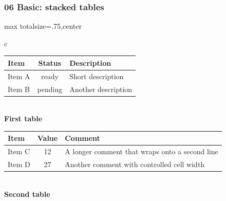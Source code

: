 
\begin{frame}
    \frametitle{06 Basic: stacked tables}

    \begin{adjustbox}{max totalsize={\textwidth}{.75\textheight},center}
        \begin{tabular}{c}
            \begin{tabular}{l c l}
                \toprule
                \textbf{\alert{Item}} & \textbf{\alert{Status}} & \textbf{\alert{Description}} \\
                \midrule
                Item A & ready & Short description \\
                Item B & pending & Another description \\
                \bottomrule
            \end{tabular}\\[-.1em]
            \textbf{First table}\\[1em]
            \begin{tabular}{p{} c p{}}
                \toprule
                \textbf{\alert{Item}} & \textbf{\alert{Value}} & \textbf{\alert{Comment}} \\
                \midrule
                Item C & 12 & A longer comment that wraps onto a second line \\
                Item D & 27 & Another comment with controlled cell width \\
                \bottomrule
            \end{tabular}\\[-.1em]
            \textbf{Second table}
        \end{tabular}
    \end{adjustbox}
\end{frame}


